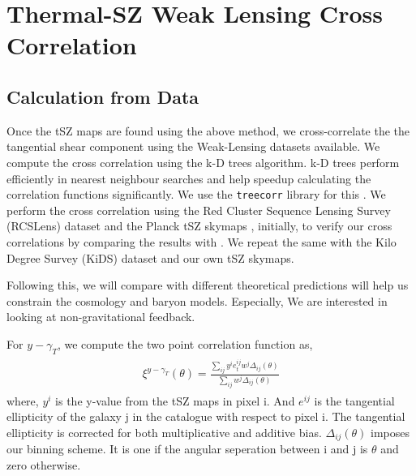 \chapter{Thermal-SZ Weak Lensing Cross Correlation}
\label{cross_correlation}
\section{Calculation from Data}
\label{tszcross}
Once the tSZ maps are found using the above method, we cross-correlate the the tangential
shear component using the Weak-Lensing datasets available.
We compute the cross correlation using
the k-D trees algorithm. k-D trees perform efficiently in nearest neighbour searches and help
speedup calculating the correlation functions significantly. We use the \texttt{treecorr} library
for this \cite{treecorr}. We perform the cross correlation
using the  Red Cluster Sequence Lensing Survey (RCSLens) dataset \cite{rcslens}
and the Planck tSZ skymaps \cite{plancksz}, initially, to verify our cross correlations by
comparing the results with \cite{tszrcscross}.
We repeat the same with the Kilo Degree Survey (KiDS) dataset \cite{kidsdr4} and
our own tSZ skymaps.

Following this, we will compare with different theoretical predictions will help us
constrain the cosmology and baryon models. Especially, We are interested in looking at
non-gravitational feedback.

For $y-\gamma_T$, we compute the two point correlation function as, 
\begin{align}
  \begin{split}
    \xi^{y - \gamma_T}(\theta) = \frac{\sum\limits_{ij} y^i e^{ij}_t w^j \Delta_{ij}(\theta)}{\sum\limits_{ij} w^j \Delta_{ij}(\theta)}
  \end{split}
\end{align}
where, $y^i$ is the y-value from the tSZ maps in pixel i. And $e^{ij}$ is the tangential ellipticity of the galaxy j in the catalogue with
respect to pixel i. The tangential ellipticity is corrected for both multiplicative and additive bias. $\Delta_{ij}(\theta)$ imposes our binning scheme.
It is one if the angular seperation between i and j is $\theta$ and zero otherwise.


